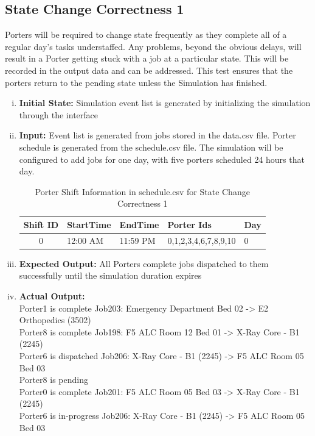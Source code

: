 \documentclass[paper=letter, fontsize=10pt]{scrartcl}
\numberwithin{equation}{section}		%
\numberwithin{figure}{section}			%
\numberwithin{table}{section}				%
\begin{document}
\subsection{State Change Correctness 1}
Porters will be required to change state frequently as they complete all of a regular day's tasks understaffed. Any problems, beyond the obvious delays, will result in a Porter getting stuck with a job at a particular state. This will be recorded in the output data and can be addressed.  This test ensures that  the porters return to the pending state unless the Simulation has finished.
\begin{enumerate}[(i)]
	\item \textbf{Initial State:} Simulation event list is generated by initializing the simulation through the interface
	\item \textbf{Input:} Event list is generated from jobs stored in the data.csv file. Porter schedule is generated from the schedule.csv file. The simulation will be configured to add jobs for one day, with five porters scheduled 24 hours that day.
	\begin{table}
	\caption{Porter Shift Information in schedule.csv for State Change Correctness 1}
	\begin{center}
    	\begin{tabular}{| c | l | l | l | l |}
    		\hline
        	Shift ID & StartTime & EndTime & Porter Ids & Day \\ \hline
  			0 & 12:00 AM & 11:59 PM & 0,1,2,3,4,6,7,8,9,10 & 0 \\ \hline
    	\end{tabular}
	\end{center}
	\end{table}
	\item \textbf{Expected Output:} All Porters complete jobs dispatched to them successfully until the simulation duration expires
	\item \textbf{Actual Output:}\\
Porter1 is complete Job203: Emergency Department Bed 02 -> E2 Orthopedics (3502)\\
Porter8 is complete Job198: F5 ALC Room 12 Bed 01 -> X-Ray Core - B1 (2245)\\
Porter6 is dispatched Job206: X-Ray Core - B1 (2245) -> F5 ALC Room 05 Bed 03\\
Porter8 is pending\\
Porter0 is complete Job201: F5 ALC Room 05 Bed 03 -> X-Ray Core - B1 (2245)\\
Porter6 is in-progress Job206: X-Ray Core - B1 (2245) -> F5 ALC Room 05 Bed 03\\

\end{enumerate}
\end{document}
